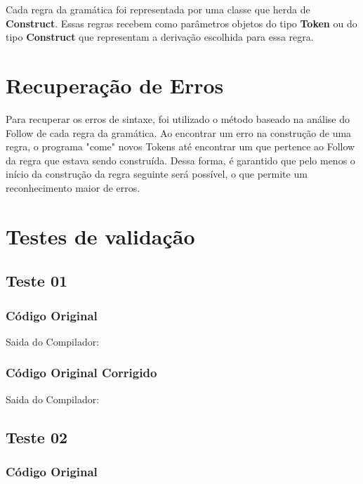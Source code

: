 Cada regra da gramática foi representada por uma classe que herda de \textbf{Construct}.
Essas regras recebem como parâmetros objetos do tipo \textbf{Token} ou do tipo \textbf{Construct} que representam a derivação escolhida para essa regra. 

\section{Recuperação de Erros}
Para recuperar os erros de sintaxe, foi utilizado o método baseado na análise do Follow de cada regra da gramática.
Ao encontrar um erro na construção de uma regra, o programa "come"  novos Tokens até encontrar um que pertence ao Follow da regra que estava sendo construída.
Dessa forma, é garantido que pelo menos o início da construção da regra seguinte será possível, o que permite um reconhecimento maior de erros.


\section{Testes de validação}
\label{sec:sintaticoTestes}

\subsection{Teste 01}
\label{subsec:sintaticoTeste01}

\subsubsection{Código Original}


Saida do Compilador:



\subsubsection{Código Original Corrigido}


Saida do Compilador:



\subsection{Teste 02}
\label{subsec:sintaticoTeste02}

\subsubsection{Código Original}


